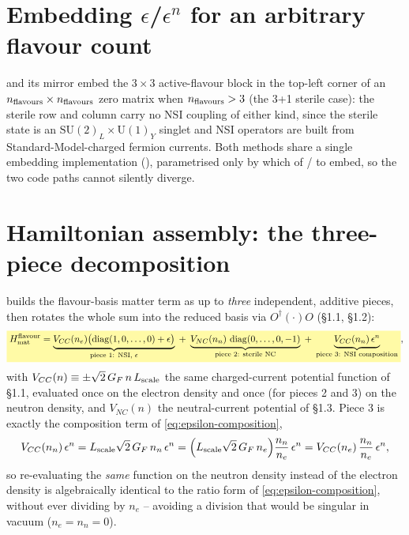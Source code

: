\section{Embedding $\epsilon$/$\epsilon^n$ for an arbitrary flavour count}

\begin{implbox}
 and its mirror
 embed the $3\times3$ active-flavour
block in the top-left corner of an $n_{\rm flavours}\times n_{\rm flavours}$
zero matrix when $n_{\rm flavours}>3$ (the 3+1 sterile case): the sterile row
and column carry no NSI coupling of either kind, since the sterile state is
an $\mathrm{SU}(2)_L\times\mathrm{U}(1)_Y$ singlet and NSI operators are
built from Standard-Model-charged fermion currents. Both methods share a
single embedding implementation (), parametrised only
by which of / to embed, so the two
code paths cannot silently diverge.
\end{implbox}

\section{Hamiltonian assembly: the three-piece decomposition}
\label{sec:impl-hamiltonian}


\begin{theorybox}
 builds the flavour-basis matter term as
up to \emph{three} independent, additive pieces, then rotates the whole sum
into the reduced basis via $O^\dagger(\cdot)O$ (\S1.1, \S1.2):
\begin{equation}
  \keyresult{
    H_{\rm mat}^{\rm flavour} =
    \underbrace{V_{CC}(n_e)\bigl(\diag(1,0,\dots,0)+\epsilon\bigr)}_{\text{piece 1: NSI, }\epsilon}
    \;+\;
    \underbrace{V_{NC}(n_n)\,\diag(0,\dots,0,-1)}_{\text{piece 2: sterile NC}}
    \;+\;
    \underbrace{V_{CC}(n_n)\,\epsilon^n}_{\text{piece 3: NSI composition}}
  },
  \label{eq:three-piece}
\end{equation}
with $V_{CC}(n)\equiv\pm\sqrt2\,G_F\,n\,L_{\rm scale}$ the same charged-current
potential function of \S1.1, evaluated once on the electron density and once
(for pieces 2 and 3) on the neutron density, and $V_{NC}(n)$ the neutral-current
potential of \S1.3. Piece 3 is exactly the composition term of
\cref{eq:epsilon-composition},
\begin{equation}
  V_{CC}(n_n)\,\epsilon^n = L_{\rm scale}\sqrt2\,G_F\,n_n\,\epsilon^n
  = \Bigl(L_{\rm scale}\sqrt2\,G_F\,n_e\Bigr)\frac{n_n}{n_e}\,\epsilon^n
  = V_{CC}(n_e)\,\frac{n_n}{n_e}\,\epsilon^n,
\end{equation}
so re-evaluating the \emph{same}  function on
the neutron density instead of the electron density is algebraically
identical to the ratio form of \cref{eq:epsilon-composition}, without ever
dividing by $n_e$ -- avoiding a division that would be singular in vacuum
($n_e=n_n=0$).
\end{theorybox}

